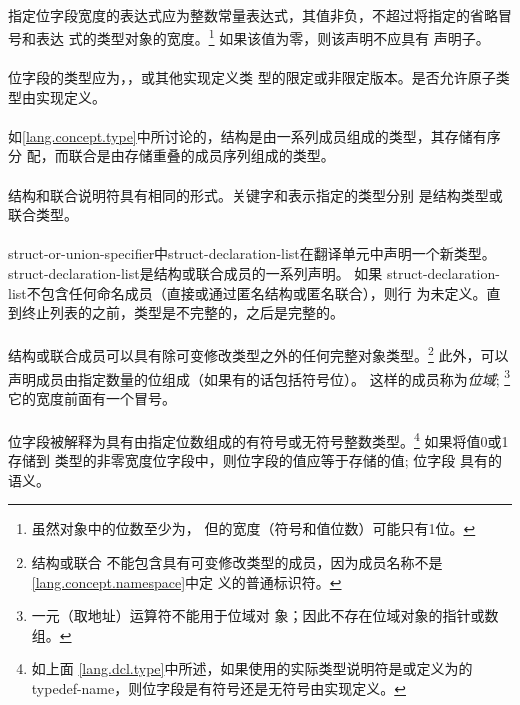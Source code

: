 \paragraph{}
指定位字段宽度的表达式应为整数常量表达式，其值非负，不超过将指定的省略冒号和表达
式的类型对象的宽度。\footnote{虽然对象中的位数至少为，
但的宽度（符号和值位数）可能只有1位。} 如果该值为零，则该声明不应具有
声明子。

\paragraph{}
位字段的类型应为，，或其他实现定义类
型的限定或非限定版本。是否允许原子类型由实现定义。

\semantic
\paragraph{}
如\ref{lang.concept.type}中所讨论的，结构是由一系列成员组成的类型，其存储有序分
配，而联合是由存储重叠的成员序列组成的类型。

\paragraph{}
结构和联合说明符具有相同的形式。关键字和表示指定的类型分别
是结构类型或联合类型。

\paragraph{}
struct-or-union-specifier中struct-declaration-list在翻译单元中声明一个新类型。
struct-declaration-list是结构或联合成员的一系列声明。 如果
struct-declaration-list不包含任何命名成员（直接或通过匿名结构或匿名联合），则行
为未定义。直到终止列表的\tm{\}}之前，类型是不完整的，之后是完整的。

\paragraph{}
结构或联合成员可以具有除可变修改类型之外的任何完整对象类型。\footnote{结构或联合
不能包含具有可变修改类型的成员，因为成员名称不是\ref{lang.concept.namespace}中定
义的普通标识符。} 此外，可以声明成员由指定数量的位组成（如果有的话包括符号位）。
这样的成员称为\textit{位域}; \footnote{一元\tm{\&}（取地址）运算符不能用于位域对
象；因此不存在位域对象的指针或数组。} 它的宽度前面有一个冒号。

\paragraph{}
位字段被解释为具有由指定位数组成的有符号或无符号整数类型。\footnote{如上面
\ref{lang.dcl.type}中所述，如果使用的实际类型说明符是或定义为的
typedef-name，则位字段是有符号还是无符号由实现定义。} 如果将值0或1存储到
类型的非零宽度位字段中，则位字段的值应等于存储的值; 位字段
具有的语义。

